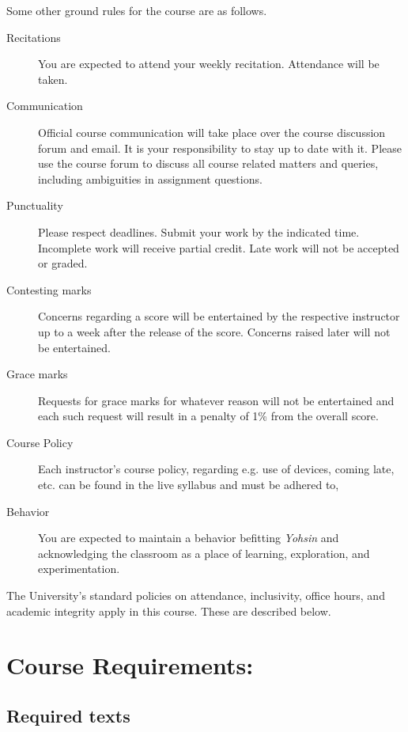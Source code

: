 \documentclass[a4paper]{article}
\begin{document}
Some other ground rules for the course are as follows.
\begin{description}
\item[Recitations] You are expected to attend your weekly recitation. Attendance will be taken.
\item[Communication] Official course communication will take place over the course discussion forum and email. It is your responsibility to stay up to date with it. Please use the course forum to discuss all course related matters and queries, including ambiguities in assignment questions.
\item[Punctuality] Please respect deadlines. Submit your work by the indicated time. Incomplete work will receive partial credit. Late work will not be accepted or graded.
\item[Contesting marks] Concerns regarding a score will be entertained by the respective instructor up to a week after the release of the score. Concerns raised later will not be entertained.
\item[Grace marks] Requests for grace marks for whatever reason will not be entertained and each such request will result in a penalty of 1\% from the overall score.
\item[Course Policy] Each instructor's course policy, regarding e.g. use of devices, coming late, etc. can be found in the live syllabus and must be adhered to,
\item[Behavior] You are expected to maintain a behavior befitting {\it Yohsin} and acknowledging the classroom as a place of learning, exploration, and experimentation.%
\end{description}

The University's standard policies on attendance, inclusivity, office hours, and academic integrity apply in this course. These are described below.

\section{Course Requirements:}


\subsection*{Required texts}
  
\end{document}
